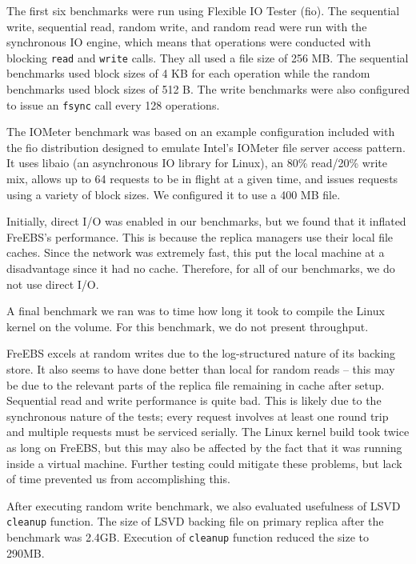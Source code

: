 The first six benchmarks were run using Flexible IO Tester (fio). The sequential write, sequential read, random write, and random read were run with the synchronous IO engine, which means that operations were conducted with blocking \texttt{read} and \texttt{write} calls. They all used a file size of 256 MB. The sequential benchmarks used block sizes of 4 KB for each operation while the random benchmarks used block sizes of 512 B. The write benchmarks were also configured to issue an \texttt{fsync} call every 128 operations.

The IOMeter benchmark was based on an example configuration included with the fio distribution designed to emulate Intel's IOMeter file server access pattern. It uses libaio (an asynchronous IO library for Linux), an 80\% read/20\% write mix, allows up to 64 requests to be in flight at a given time, and issues requests using a variety of block sizes. We configured it to use a 400 MB file.

Initially, direct I/O was enabled in our benchmarks, but we found that it inflated FreEBS's performance. This is because the replica managers use their local file caches. Since the network was extremely fast, this put the local machine at a disadvantage since it had no cache. Therefore, for all of our benchmarks, we do not use direct I/O.

A final benchmark we ran was to time how long it took to compile the Linux kernel on the volume. For this benchmark, we do not present throughput.

FreEBS excels at random writes due to the log-structured nature of its backing store. It also seems to have done better than local for random reads -- this may be due to the relevant parts of the replica file remaining in cache after setup. Sequential read and write performance is quite bad. This is likely due to the synchronous nature of the tests; every request involves at least one round trip and multiple requests must be serviced serially. The Linux kernel build took twice as long on FreEBS, but this may also be affected by the fact that it was running inside a virtual machine. Further testing could mitigate these problems, but lack of time prevented us from accomplishing this.

After executing random write benchmark, we also evaluated usefulness of LSVD \texttt{cleanup} function. The size of LSVD backing file on primary replica after the benchmark was 2.4GB. Execution of \texttt{cleanup} function reduced the size to 290MB.
